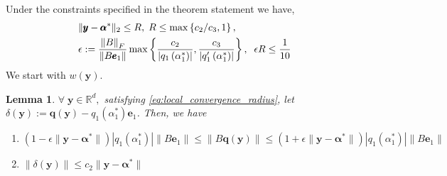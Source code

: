 \documentclass[letterpaper]{article}
\newtheorem{lemma}[theorem]{Lemma}
\newcommand{\ba}[1]{\begin{align}#1\end{align}}
\newcommand{\balpha}{\pmb{\alpha}}
\newcommand{\by}{\pmb{y}}
\newcommand{\be}{\pmb{e}}
\newcommand{\bb}[1]{\left(#1\right)}
\begin{document}
Under the constraints specified in the theorem statement we have,  
\ba{
    & \|\by-\balpha^{*}\|_{2} \leq R, \; R \leq \max\left\{c_{2}/c_{3}, 1\right\}, \notag \\
    & \epsilon := \frac{\left\|B\right\|_{F}}{\left\|B\be_{1}\right\|}\max\left\{\frac{c_{2}}{\left|q_{1}\bb{\alpha^{*}_{1}}\right|}, \frac{c_{3}}{\left|q_{1}'\bb{\alpha^{*}_{1}}\right|}\right\}, \;\; \epsilon R \leq \frac{1}{10} \label{eq:local_convergence_radius}
}
We start with $w\bb{\by}$.
\begin{lemma}
    \label{lemma:normBy_bounds}
    $\forall \; \by \in \mathbb{R}^{d},$ satisfying \eqref{eq:local_convergence_radius}, let $\delta\bb{\by} := \bm{q}\bb{\by} - q_{1}\bb{\alpha^{*}_{1}}\be_{1}$. Then, we have
    \begin{enumerate}
        \item $\bb{1-\epsilon\|\by-\balpha^{*}\|}\left|q_{1}\bb{\alpha^{*}_{1}}\right|\left\|B\be_{1}\right\| \leq \|B\bm{q}\bb{\by}\| \leq \bb{1+\epsilon\|\by-\balpha^{*}\|}\left|q_{1}\bb{\alpha^{*}_{1}}\right|\left\|B\be_{1}\right\|$
        \item $\|\delta\bb{\by}\| \leq c_{2}\|\by-\balpha^{*}\|$
    \end{enumerate}
\end{lemma}
\end{document}
